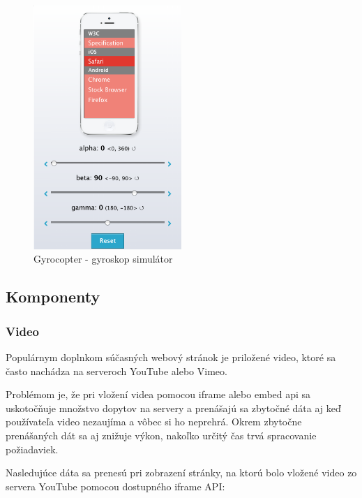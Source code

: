 \begin{figure}[H]
  \centering
  \includegraphics[width=0.5\textwidth]{img/gyrocopter.png}
  \caption[Gyrocopter - gyroskop simulátor]{
    Gyrocopter - gyroskop simulátor}
  \label{fig: gyrocopter}
\end{figure}




\subsection{Komponenty} %
\label{sub:komponenty}

\subsubsection{Video} %
\label{subsub:video}

Populárnym doplnkom súčasných webový stránok je priložené video, ktoré sa často nachádza na serveroch YouTube alebo Vimeo.

Problémom je, že pri vložení videa pomocou iframe alebo embed api sa uskotočňuje množstvo dopytov na servery a prenášajú sa zbytočné dáta aj keď používateľa video nezaujíma a vôbec si ho neprehrá. Okrem zbytočne prenášaných dát sa aj znižuje výkon, nakoľko určitý čas trvá spracovanie požiadaviek.

Nasledujúce dáta sa prenesú pri zobrazení stránky, na ktorú bolo vložené video zo servera YouTube pomocou dostupného iframe API:

